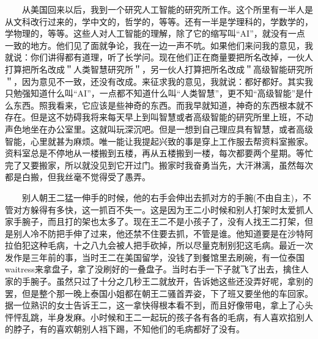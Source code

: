 　　从美国回来以后，我到一个研究人工智能的研究所工作。这个所里有一半人是从文科改行过来的，学中文的，哲学的，等等。还有一半是学理科的，学数学的，学物理的，等等。这些人对人工智能的理解，除了它的缩写叫“AI”，就没有一点一致的地方。他们见了面就争论，我在一边一声不吭。如果他们来问我的意见，我就说：你们讲得都有道理，听了长学问。现在他们正在商量要把所名改掉，一伙人打算把所名改成＂人类智慧研究所＂，另一伙人打算把所名改成＂高级智能研究所＂，因为意见不一致，还没有改成。来征求我的意见，我就说：都好都好。其实我只勉强知道什么叫“AI”，一点都不知道什么叫“人类智慧”，更不知“高级智能”是什么东西。照我看来，它应该是些神奇的东西。而我早就知道，神奇的东西根本就不存在。但是这不妨碍我将来每天早上到叫智慧或者高级智能的研究所里上班，不动声色地坐在办公室里。这就叫玩深沉吧。但是一想到自己理应具有智慧，或者高级智能，心里就甚为麻烦。唯一能让我提起兴致的事是穿上工作服去帮资料室搬家。资料室总是不停地从一楼搬到五楼，再从五楼搬到一楼，每次都要两个星期。等忙完了又要搬家，所以就没见到它开过门。搬家时我奋勇当先，大汗淋漓，虽然每次都是白搬，但我丝毫不觉得受了愚弄。

　　别人朝王二猛一伸手的时候，他的右手会伸出去抓对方的手腕(不由自主)，不管对方躲得有多快，这一抓百不失一。这是因为王二小时候和别人打架时太爱抓人家手腕子，而且打的架也太多了。现在王二不是小孩子了，没有人找王二打架，但是别人冷不防把手伸了过来，他还禁不住要去抓，不管是谁。他知道要是在沙特阿拉伯犯这种毛病，十之八九会被人把手砍掉，所以尽量克制别犯这毛病。最近一次发作是三年前的事，当时王二在美国留学，没钱了到餐馆里去刷碗，有一位泰国waitress来拿盘子，拿了没刷好的一叠盘子。当时右手一下子就飞了出去，擒住人家的手腕子。虽然只过了十分之几秒王二就放开，告诉她这些还没弄好呢，拿别的罢，但是整个那一晚上泰国小姐都在朝王二骚首弄姿，下了班又要坐他的车回家。据一位熟识的女士告诉王二，这一拿快得根本看不到，而且好像带电，拿上了心头怦怦乱跳，半身发麻。小时候和王二一起玩的孩子各有各的毛病，有人喜欢掐别人的脖子，有的喜欢朝别人裆下踢，不知他们的毛病都好了没有。

